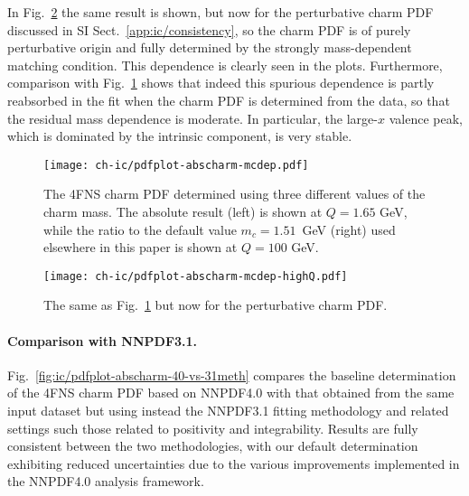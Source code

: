 In Fig.~\ref{fig:ic/charm_pert_mcdep} the same result is shown, but now
for the perturbative charm PDF discussed in
SI Sect.~\ref{app:ic/consistency},  so the charm PDF is of
purely perturbative origin and fully determined by the strongly
mass-dependent matching condition. This dependence is clearly seen in
the plots. Furthermore, comparison with
Fig.~\ref{fig:ic/charm_fitted_mcdep} shows that indeed this spurious
dependence is partly reabsorbed in the fit when the charm PDF is
determined from the data, so that  the residual mass dependence is moderate.
In particular, the large-$x$ valence peak, which is dominated by the
intrinsic component, is very stable.

\begin{figure}[t]
  \begin{center}
    \texttt{[image: ch-ic/pdfplot-abscharm-mcdep.pdf]}
    \caption{\small The 4FNS charm PDF determined
    using three different values of the charm mass. The absolute
    result (left) is shown at $Q=1.65$ GeV, while the ratio to the 
       default value
       $m_c=1.51$~GeV (right) used elsewhere in this paper is shown at $Q=100$ GeV.
   \label{fig:ic/charm_fitted_mcdep} }
\end{center}
\end{figure}

\begin{figure}[t]
  \begin{center}
    \texttt{[image: ch-ic/pdfplot-abscharm-mcdep-highQ.pdf]}
    \caption{\small The same as Fig.~\ref{fig:ic/charm_fitted_mcdep} but now
    for the perturbative charm PDF.
  \label{fig:ic/charm_pert_mcdep} }
\end{center}
\end{figure}



  \paragraph{Comparison with NNPDF3.1.}
  Fig.~\ref{fig:ic/pdfplot-abscharm-40-vs-31meth} compares
  the baseline determination of the 4FNS charm PDF based
  on NNPDF4.0 with that obtained
  from the same input dataset but using instead
  the NNPDF3.1 fitting methodology and related settings such those related to positivity
  and integrability.
  Results are fully consistent between the two methodologies, with our default
  determination exhibiting reduced uncertainties due to
  the various improvements implemented
  in the NNPDF4.0 analysis framework.
  
